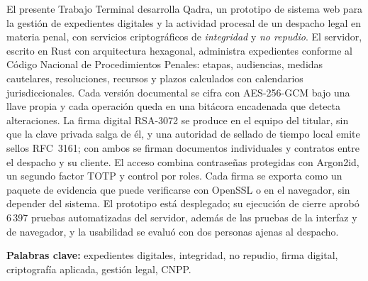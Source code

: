 El presente Trabajo Terminal desarrolla Qadra, un prototipo de sistema web
para la gestión de expedientes digitales y la actividad procesal de un
despacho legal en materia penal, con servicios criptográficos de
\emph{integridad} y \emph{no repudio}. El servidor, escrito en Rust con
arquitectura hexagonal, administra expedientes conforme al Código Nacional
de Procedimientos Penales: etapas, audiencias, medidas cautelares,
resoluciones, recursos y plazos calculados con calendarios jurisdiccionales.
Cada versión documental se cifra con AES-256-GCM bajo una llave propia y
cada operación queda en una bitácora encadenada que detecta alteraciones.
La firma digital RSA-3072 se produce en el equipo del titular, sin que la
clave privada salga de él, y una autoridad de sellado de tiempo local
emite sellos RFC~3161; con ambos se firman documentos individuales y
contratos entre el despacho y su cliente. El acceso combina contraseñas
protegidas con Argon2id, un segundo factor TOTP y control por roles. Cada
firma se exporta como un paquete de evidencia que puede verificarse con
OpenSSL o en el navegador, sin depender del sistema. El prototipo está
desplegado; su ejecución de cierre aprobó 6\,397 pruebas automatizadas del
servidor, además de las pruebas de la interfaz y de navegador, y la
usabilidad se evaluó con dos personas ajenas al despacho.

\vspace{1em}
\noindent\textbf{Palabras clave:} expedientes digitales, integridad,
no repudio, firma digital, criptografía aplicada, gestión legal, CNPP.
